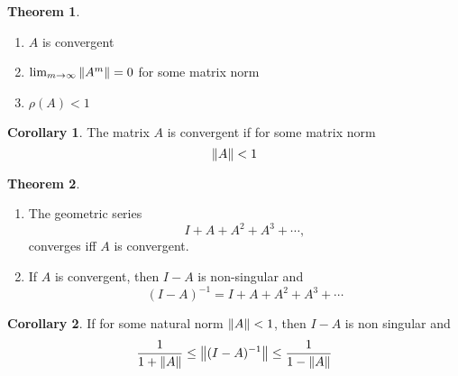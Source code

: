 \documentclass[11pt,letterpaper]{article}
\numberwithin{figure}{section} %
\newcommand{\inv}[1]{#1^{-1}}
\theoremstyle{definition}
\newtheorem{theorem}{Theorem}[subsection]
\theoremstyle{definition}
\theoremstyle{definition}
\theoremstyle{definition}
\theoremstyle{definition}
\newtheorem*{corollary}{Corollary}
\theoremstyle{remark}
\theoremstyle{remark}
\theoremstyle{definition}
\theoremstyle{remark}
\theoremstyle{remark}
\begin{document}
\begin{multicols*}{3}
\begin{theorem}
\begin{enumerate}[label={(\alph*)}]
		\item $A$ is convergent
		\item $\lim_{m \to \infty} \norm{A^m} = 0$ for some matrix norm
		\item $\rho(A) < 1$
	\end{enumerate}
\end{theorem}
\begin{corollary}
	The matrix $A$ is convergent if for some matrix norm 
	\[
		\norm{A} < 1
	\]
\end{corollary}
\begin{theorem}
	\begin{enumerate}[label={(\alph*)}]
		\item
			The geometric series
			\[
				I + A + A^2 + A^3 + \cdots,
			\]
			converges iff $A$ is convergent.
		\item
			If $A$ is convergent, then $I - A$ is non-singular and
			\[
				\inv{(I - A)} = I + A + A^2 + A^3 + \cdots
			\]
	\end{enumerate}
\end{theorem}
\begin{corollary}
	If for some natural norm $\norm{A} < 1$, then $I - A$ is non singular and
	\[
		\frac{1}{1 + \norm{A}} \leq \norm{\inv{(I - A)}} \leq \frac{1}{1 - \norm{A}}
	\]
\end{corollary}

\end{multicols*}
\end{document}
